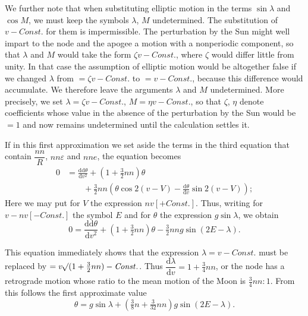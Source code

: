 \par\noindent\hspace*{\parindent}We further note that when substituting elliptic motion
in the terms \(\sin\lambda\) and \(\cos M\), we must keep the symbols \(\lambda\), \(M\)
undetermined. The substitution of \(v-\mathit{Const.}\)
for them is impermissible. The perturbation by the Sun might well impart
to the node and the apogee a motion with a nonperiodic component,
so that \(\lambda\) and \(M\) would take the form \(\zeta v-\mathit{Const.}\),
where \(\zeta\) would differ little from unity.
In that case the assumption of elliptic motion would be altogether false
if we changed \(\lambda\) from \(=\zeta v-\mathit{Const.}\) to \(=v-\mathit{Const.}\),
because this difference would accumulate.
We therefore leave the arguments \(\lambda\) and \(M\) undetermined. More precisely,
we set \(\lambda=\zeta v-\mathit{Const.}\), \(M=\eta v-\mathit{Const.}\),
so that \(\zeta\), \(\eta\) denote coefficients whose value in the absence of the perturbation
by the Sun would be \(=1\) and now remains undetermined
until the calculation settles it.

\par\noindent\hspace*{\parindent}If in this first approximation we set aside the
terms in the third equation that contain \(\dfrac{nn}{R}\), \(nn\varepsilon\) and \(nne\),
the equation becomes
\[
\begin{aligned}
0&=\frac{\mathrm{dd}\theta}{\mathrm{d}v^2}+(1+\tfrac32nn)\theta\\
&\qquad+\tfrac32nn\left(\theta\cos2(v-V)
-\frac{\mathrm{d}\theta}{\mathrm{d}v}\sin2(v-V)\right);
\end{aligned}
\]
\noindent Here we may put for \(V\) the expression \(nv[+\mathit{Const.}]\).
Thus, writing for \(v-nv[-\mathit{Const.}]\) the symbol \(E\) and for
\(\theta\) the expression \(g\sin\lambda\), we obtain
\[
0=\frac{\mathrm{dd}\theta}{\mathrm{d}v^2}+(1+\tfrac32nn)\theta
-\tfrac32nng\sin(2E-\lambda).
\]

\par\noindent\hspace*{\parindent}This equation immediately shows that the expression
\(\lambda=v-\mathit{Const.}\) must be replaced by
\(=v\mathord{{}^{}\!\surd}(1+\tfrac32nn)-\mathit{Const.}\).
Thus \(\dfrac{\mathrm{d}\lambda}{\mathrm{d}v}=1+\tfrac34nn\), or the
node has a retrograde motion whose ratio to the mean motion
of the Moon is \(\tfrac34nn:1\). From this follows the first approximate
value
\[
\theta=g\sin\lambda+(\tfrac38n+\tfrac{3}{32}nn)g\sin(2E-\lambda).
\]

